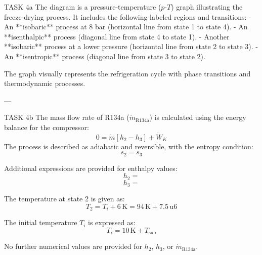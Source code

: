 TASK 4a  
The diagram is a pressure-temperature (\(p\)-\(T\)) graph illustrating the freeze-drying process. It includes the following labeled regions and transitions:  
- An **isobaric** process at 8 bar (horizontal line from state 1 to state 4).  
- An **isenthalpic** process (diagonal line from state 4 to state 1).  
- Another **isobaric** process at a lower pressure (horizontal line from state 2 to state 3).  
- An **isentropic** process (diagonal line from state 3 to state 2).  

The graph visually represents the refrigeration cycle with phase transitions and thermodynamic processes.

---

TASK 4b  
The mass flow rate of R134a (\( \dot{m}_{\text{R134a}} \)) is calculated using the energy balance for the compressor:  
\[
0 = \dot{m} \left[ h_2 - h_3 \right] + \dot{W}_K
\]  
The process is described as adiabatic and reversible, with the entropy condition:  
\[
s_2 = s_3
\]  

Additional expressions are provided for enthalpy values:  
\[
h_2 = 
\]  
\[
h_3 = 
\]  

The temperature at state 2 is given as:  
\[
T_2 = T_i + 6 \, \text{K} = 94 \, \text{K} + 7.5 \, \text{u}6
\]  

The initial temperature \( T_i \) is expressed as:  
\[
T_i = 10 \, \text{K} + T_{\text{sub}}
\]  

No further numerical values are provided for \( h_2 \), \( h_3 \), or \( \dot{m}_{\text{R134a}} \).